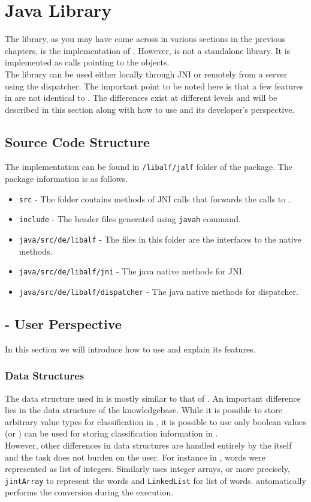 \chapter{\jalf Java Library}

The \jalf \java library, as you may have come across in various sections in the previous chapters, is the \java implementation of \libalf. However, \jalf is not a standalone library. It is implemented as calls pointing to the \cpp \libalf objects. \\
The \jalf library can be used either locally through JNI or remotely from a server using the dispatcher. The important point to be noted here is that a few features in \jalf are not identical to \libalf. The differences exist at different levels and will be described in this section along with how to use \jalf and its developer's perspective.


\section{Source Code Structure}
The \jalf implementation can be found in \texttt{/libalf/jalf} folder of the \libalf package. The \jalf package information is as follows.
\begin{itemize}
 \item \texttt{src} - The folder contains \cpp methods of JNI calls that forwards the calls to \libalf.
 \item \texttt{include} - The header files generated using \texttt{javah} command.
 \item \texttt{java/src/de/libalf} - The files in this folder are the interfaces to the native methods.
 \item \texttt{java/src/de/libalf/jni} - The java native methods for JNI.
 \item \texttt{java/src/de/libalf/dispatcher} - The java native methods for dispatcher.
\end{itemize}

\section{\jalf - User Perspective}
In this section we will introduce how to use \jalf and explain its features.

\subsection*{Data Structures}
The data structure used in \jalf is mostly similar to that of \libalf. An important difference lies in the data structure of the knowledgebase. While it is possible to store arbitrary value types for classification in \libalf, it is possible to use only boolean values (\true or \false) can be used for storing classification information in \jalf. \\
However, other differences in data structures are handled entirely by the \jalf itself and the task does not burden on the user. 
For instance in \libalf, words were represented as list of integers. Similarly \jalf uses integer arrays, or more precisely, \texttt{jintArray} to represent the words and \texttt{LinkedList} for list of words. \jalf automatically performs the conversion during the execution.

